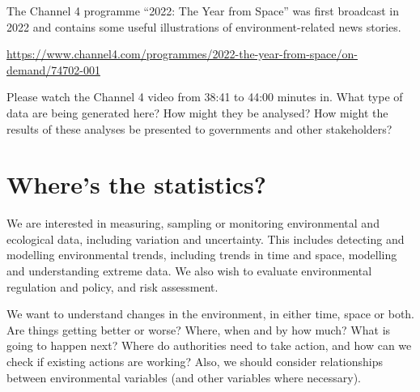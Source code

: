 \documentclass[
  letterpaper,
  DIV=11,
  numbers=noendperiod]{scrartcl}
\begin{document}
\begin{tcolorbox}[enhanced jigsaw, coltitle=black, colframe=quarto-callout-note-color-frame, bottomrule=.15mm, leftrule=.75mm, toptitle=1mm, titlerule=0mm, title={Channel 4 programme ``2022: The Year from Space''}, bottomtitle=1mm, toprule=.15mm, rightrule=.15mm, arc=.35mm, opacityback=0, opacitybacktitle=0.6, left=2mm, colbacktitle=quarto-callout-note-color!10!white, breakable, colback=white]

The Channel 4 programme ``2022: The Year from Space'' was first
broadcast in 2022 and contains some useful illustrations of
environment-related news stories.

\url{https://www.channel4.com/programmes/2022-the-year-from-space/on-demand/74702-001}

\end{tcolorbox}

\begin{tcolorbox}[enhanced jigsaw, coltitle=black, colframe=quarto-callout-tip-color-frame, bottomrule=.15mm, leftrule=.75mm, toptitle=1mm, titlerule=0mm, title={Exercise 2}, bottomtitle=1mm, toprule=.15mm, rightrule=.15mm, arc=.35mm, opacityback=0, opacitybacktitle=0.6, left=2mm, colbacktitle=quarto-callout-tip-color!10!white, breakable, colback=white]

Please watch the Channel 4 video from 38:41 to 44:00 minutes in. What
type of data are being generated here? How might they be analysed? How
might the results of these analyses be presented to governments and
other stakeholders?

\end{tcolorbox}

\section{Where's the statistics?}\label{wheres-the-statistics}

We are interested in measuring, sampling or monitoring environmental and
ecological data, including variation and uncertainty. This includes
detecting and modelling environmental trends, including trends in time
and space, modelling and understanding extreme data. We also wish to
evaluate environmental regulation and policy, and risk assessment.

We want to understand changes in the environment, in either time, space
or both. Are things getting better or worse? Where, when and by how
much? What is going to happen next? Where do authorities need to take
action, and how can we check if existing actions are working? Also, we
should consider relationships between environmental variables (and other
variables where necessary).
\end{document}
